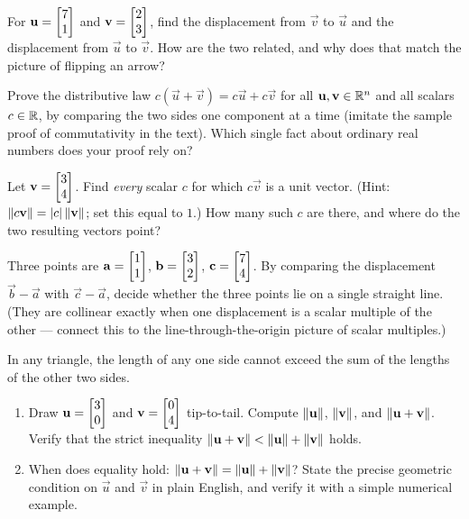 \begin{exercise}
\label{ch02:exr-displacement}
For $\mathbf{u}=\begin{bmatrix}7\\1\end{bmatrix}$ and $\mathbf{v}=\begin{bmatrix}2\\3\end{bmatrix}$, find the displacement from
$\vec{v}$ to $\vec{u}$ and the displacement from $\vec{u}$ to $\vec{v}$. How are the two
related, and why does that match the picture of flipping an arrow?
\end{exercise}

\begin{exercise}
\label{ch02:exr-proof}
Prove the distributive law $c(\vec{u}+\vec{v}) = c\vec{u} + c\vec{v}$ for all
$\mathbf{u},\mathbf{v}\in\mathbb{R}^n$ and all scalars $c\in\mathbb{R}$, by comparing the two sides one
component at a time (imitate the sample proof of commutativity in the text). Which single
fact about ordinary real numbers does your proof rely on?
\end{exercise}

\begin{exercise}
\label{ch02:exr-challenge}
Let $\mathbf{v}=\begin{bmatrix}3\\4\end{bmatrix}$. Find \emph{every} scalar $c$ for which $c\vec{v}$ is a unit
vector. (Hint: $\lVert c\mathbf{v}\rVert = \lvert c\rvert\,\lVert\mathbf{v}\rVert$; set this equal to $1$.) How
many such $c$ are there, and where do the two resulting vectors point?
\end{exercise}

\begin{exercise}
\label{ch02:exr-collinear}
Three points are $\mathbf{a}=\begin{bmatrix}1\\1\end{bmatrix}$, $\mathbf{b}=\begin{bmatrix}3\\2\end{bmatrix}$, $\mathbf{c}=\begin{bmatrix}7\\4\end{bmatrix}$.
By comparing the displacement $\vec{b}-\vec{a}$ with $\vec{c}-\vec{a}$, decide whether the
three points lie on a single straight line. (They are collinear exactly when one
displacement is a scalar multiple of the other --- connect this to the line-through-the-origin
picture of scalar multiples.)
\end{exercise}

\begin{exercise}
\label{ch02:exr-triangle-inequality}
In any triangle, the length of any one side cannot exceed the sum of the lengths of the other two sides.
\begin{enumerate}[label=(\alph*)]
  \item Draw $\mathbf{u}=\begin{bmatrix}3\\0\end{bmatrix}$ and $\mathbf{v}=\begin{bmatrix}0\\4\end{bmatrix}$ tip-to-tail. Compute $\lVert\mathbf{u}\rVert$,
        $\lVert\mathbf{v}\rVert$, and $\lVert\mathbf{u}+\mathbf{v}\rVert$. Verify that the strict inequality
        $\lVert\mathbf{u}+\mathbf{v}\rVert < \lVert\mathbf{u}\rVert + \lVert\mathbf{v}\rVert$ holds.
  \item When does equality hold: $\lVert\mathbf{u}+\mathbf{v}\rVert = \lVert\mathbf{u}\rVert + \lVert\mathbf{v}\rVert$? State the
        precise geometric condition on $\vec{u}$ and $\vec{v}$ in plain English, and verify it with a simple
        numerical example.
\end{enumerate}
\end{exercise}
